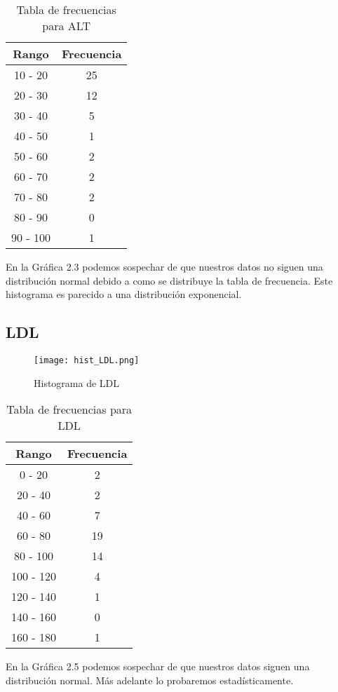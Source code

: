 \documentclass[12pt]{report}
\begin{document}
\begin{table}[H]
    \centering
    \begin{tabular}{|c|c|}
        \hline
        \textbf{Rango} & \textbf{Frecuencia} \\
        \hline
        10 - 20 & 25 \\
        20 - 30 & 12 \\
        30 - 40 & 5 \\
        40 - 50 & 1 \\
        50 - 60 & 2 \\
        60 - 70 & 2 \\
        70 - 80 & 2 \\
        80 - 90 & 0 \\
        90 - 100 & 1 \\
        \hline
    \end{tabular}
    \caption{Tabla de frecuencias para ALT}
\end{table}
\noindent En la Gráfica 2.3 podemos sospechar de que nuestros datos no siguen una distribución normal debido a como se distribuye la tabla de frecuencia. Este histograma es parecido a una distribución exponencial.

\subsection{LDL}
\begin{figure}[H]
    \centering
    \texttt{[image: hist\_LDL.png]}
    \caption{Histograma de LDL}
\end{figure}

\begin{table}[H]
    \centering
    \begin{tabular}{|c|c|}
        \hline
        \textbf{Rango} & \textbf{Frecuencia} \\
        \hline
        0 - 20 & 2 \\
        20 - 40 & 2 \\
        40 - 60 & 7 \\
        60 - 80 & 19 \\
        80 - 100 & 14 \\
        100 - 120 & 4 \\
        120 - 140 & 1 \\
        140 - 160 & 0 \\
        160 - 180 & 1 \\
        \hline
    \end{tabular}
    \caption{Tabla de frecuencias para LDL}
\end{table}
\noindent En la Gráfica 2.5 podemos sospechar de que nuestros datos siguen una distribución normal. Más adelante lo probaremos estadísticamente.
\end{document}
